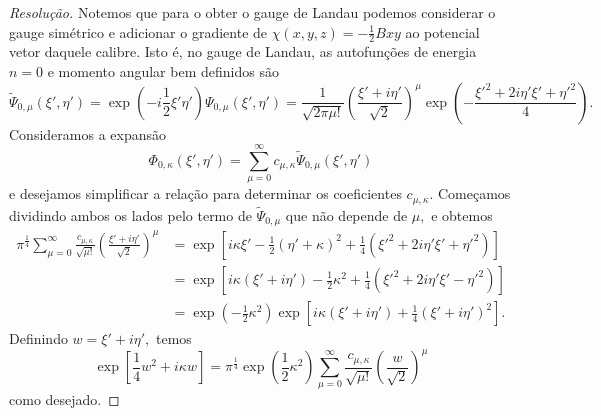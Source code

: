\begin{proof}[Resolução]
   Notemos que para o obter o gauge de Landau podemos considerar o gauge simétrico e adicionar o gradiente de \(\chi(x,y,z) = -\frac12 B xy\) ao potencial vetor daquele calibre. Isto é, no gauge de Landau, as autofunções de energia \(n = 0\) e momento angular bem definidos são
   \begin{equation*}
      \tilde{\Psi}_{0, \mu}(\xi',\eta') = \exp\left(-i \frac12\xi'\eta'\right) \Psi_{0,\mu}(\xi', \eta') = \frac{1}{\sqrt{2\pi \mu!}} \left(\frac{\xi' + i \eta'}{\sqrt{2}}\right)^\mu \exp\left(-\frac{{\xi'}^2 + 2 i \eta' \xi' +  {\eta'}^2}{4}\right).
   \end{equation*}
   Consideramos a expansão
   \begin{equation*}
      \Phi_{0,\kappa}(\xi', \eta') = \sum_{\mu = 0}^\infty c_{\mu, \kappa}\tilde{\Psi}_{0,\mu}(\xi', \eta')
   \end{equation*}
   e desejamos simplificar a relação para determinar os coeficientes \(c_{\mu,\kappa}.\) Começamos dividindo ambos os lados pelo termo de \(\tilde{\Psi}_{0,\mu}\) que não depende de \(\mu,\) e obtemos
   \begin{align*}
      \pi^{\frac14} \sum_{\mu = 0}^{\infty} \frac{c_{\mu,\kappa}}{\sqrt{\mu!}}\left(\frac{\xi' + i \eta'}{\sqrt{2}}\right)^\mu 
      &= \exp\left[i \kappa \xi' - \frac12 (\eta' + \kappa)^2 + \frac14({\xi'}^2 + 2 i \eta' \xi' + {\eta'}^2)\right]\\
      &= \exp\left[i \kappa (\xi' + i \eta') - \frac12 \kappa^2 + \frac14 ({\xi'}^2 + 2i \eta' \xi' - {\eta'}^2)\right]\\
      &= \exp\left(-\frac12 \kappa^2\right) \exp\left[i \kappa (\xi' + i \eta') + \frac14 (\xi' + i \eta')^2\right].
   \end{align*}
   Definindo \(w = \xi' + i \eta',\) temos
   \begin{equation*}
      \exp\left[\frac14 w^2 + i \kappa w\right] = \pi^{\frac14} \exp\left(\frac12 \kappa^2\right) \sum_{\mu = 0}^\infty \frac{c_{\mu, \kappa}}{\sqrt{\mu!}} \left(\frac{w}{\sqrt{2}}\right)^\mu
   \end{equation*}
   como desejado.
\end{proof}
